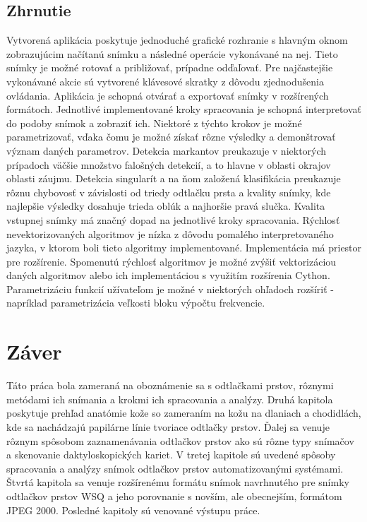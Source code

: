   \section{Zhrnutie}
  Vytvorená aplikácia poskytuje jednoduché grafické rozhranie s hlavným oknom zobrazujúcim načítanú snímku a následné operácie vykonávané na nej.
  Tieto snímky je možné rotovať a približovať, prípadne odďaľovať. Pre najčastejšie vykonávané akcie sú vytvorené klávesové skratky z dôvodu zjednodušenia
  ovládania.
  Aplikácia je schopná otvárať a exportovať snímky v rozšírených formátoch. Jednotlivé implementované kroky spracovania je schopná interpretovať
  do podoby snímok a zobraziť ich. Niektoré z týchto krokov je možné parametrizovať, vďaka čomu je možné získať rôzne výsledky a demonštrovať význam daných
  parametrov. Detekcia markantov preukazuje v niektorých prípadoch väčšie množstvo falošných detekcií, a to hlavne v oblasti okrajov oblasti záujmu.
  Detekcia singularít a na ňom založená klasifikácia preukazuje rôznu chybovosť v závislosti od triedy odtlačku prsta a kvality snímky,
  kde najlepšie výsledky dosahuje trieda oblúk a najhoršie pravá slučka. Kvalita vstupnej snímky má značný dopad na jednotlivé kroky spracovania.
  Rýchlosť nevektorizovaných algoritmov je nízka z dôvodu pomalého interpretovaného jazyka, v ktorom boli tieto algoritmy implementované.
  Implementácia má priestor pre rozšírenie. Spomenutú rýchlosť algoritmov je možné zvýšiť vektorizáciou daných algoritmov alebo ich implementáciou
  s využitím rozšírenia Cython. Parametrizáciu funkcií užívateľom je možné v niektorých ohľadoch rozšíriť - napríklad parametrizácia veľkosti bloku výpočtu
  frekvencie.

  \chapter{Záver}
  Táto práca bola zameraná na oboznámenie sa s odtlačkami prstov, rôznymi metódami ich snímania a krokmi ich spracovania a analýzy. Druhá kapitola poskytuje
  prehľad anatómie kože so zameraním na kožu na dlaniach a chodidlách, kde sa nachádzajú papilárne línie tvoriace odtlačky prstov. Ďalej sa venuje rôznym
  spôsobom zaznamenávania odtlačkov prstov ako sú rôzne typy snímačov a skenovanie daktyloskopických kariet. V tretej kapitole sú uvedené spôsoby
  spracovania a analýzy snímok odtlačkov prstov automatizovanými systémami. Štvrtá kapitola sa venuje rozšírenému formátu snímok navrhnutého pre snímky
  odtlačkov prstov WSQ a jeho porovnanie s novším, ale obecnejším, formátom JPEG 2000. Posledné kapitoly sú venované výstupu práce.

